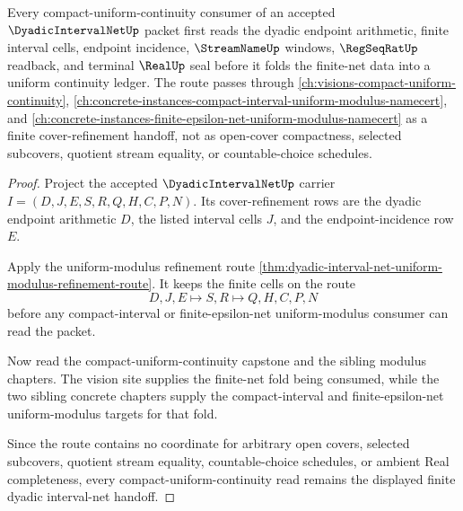 \begin{theorem}
\label{thm:dyadic-interval-net-compact-uniform-continuity-forward-route}
Every compact-uniform-continuity consumer of an accepted $\DyadicIntervalNetUp$
packet first reads the dyadic endpoint arithmetic, finite interval cells,
endpoint incidence, $\StreamNameUp$ windows, $\RegSeqRatUp$ readback, and
terminal $\RealUp$ seal before it folds the finite-net data into a uniform
continuity ledger. The route passes through
\autoref{ch:visions-compact-uniform-continuity},
\autoref{ch:concrete-instances-compact-interval-uniform-modulus-namecert},
and \autoref{ch:concrete-instances-finite-epsilon-net-uniform-modulus-namecert}
as a finite cover-refinement handoff, not as open-cover compactness, selected
subcovers, quotient stream equality, or countable-choice schedules.
\end{theorem}
\begin{proof}
Project the accepted $\DyadicIntervalNetUp$ carrier
$I=(D,J,E,S,R,Q,H,C,P,N)$. Its cover-refinement rows are the dyadic endpoint
arithmetic $D$, the listed interval cells $J$, and the endpoint-incidence row
$E$.

Apply the uniform-modulus refinement route
\autoref{thm:dyadic-interval-net-uniform-modulus-refinement-route}. It keeps
the finite cells on the route
$$
D,J,E \longmapsto S,R \longmapsto Q,H,C,P,N
$$
before any compact-interval or finite-epsilon-net uniform-modulus consumer can
read the packet.

Now read the compact-uniform-continuity capstone and the sibling modulus
chapters. The vision site supplies the finite-net fold being consumed, while
the two sibling concrete chapters supply the compact-interval and
finite-epsilon-net uniform-modulus targets for that fold.

Since the route contains no coordinate for arbitrary open covers, selected
subcovers, quotient stream equality, countable-choice schedules, or ambient
Real completeness, every compact-uniform-continuity read remains the displayed
finite dyadic interval-net handoff.
\end{proof}
